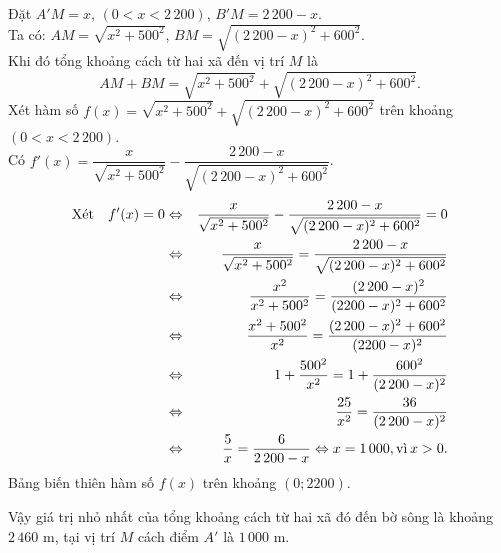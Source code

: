 \begin{bt}
{\begin{center}
        \end{center}
        Đặt $A'M=x$, $(0<x<2\,200)$,  $B'M=2\,200-x$.\\
        Ta có: $AM=\sqrt{x^2+500^2}$, $BM=\sqrt{(2\,200-x)^2+600^2}$.\\
        Khi đó tổng khoảng cách từ hai xã đến vị trí $M$ là
        \[AM+BM= \sqrt{x^2+500^2}+\sqrt{(2\,200-x)^2+600^2}.\]
        Xét hàm số $f(x)= \sqrt{x^2+500^2}+\sqrt{(2\,200-x)^2+600^2}$ trên khoảng $(0<x<2\,200)$.\\ 
        Có $f'(x)=\dfrac{x}{\sqrt{x^2+500^2}}-\dfrac{2\,200-x}{\sqrt{(2\,200-x)^2+600^2}}$.
        \begin{eqnarray*}
            \text{Xét}\quad f'(x)=0&\Leftrightarrow & \dfrac{x}{\sqrt{x^2+500^2}}-\dfrac{2\,200-x}{\sqrt{(2\,200-x)^2+600^2}}=0\\
            &\Leftrightarrow & \dfrac{x}{\sqrt{x^2+500^2}}=\dfrac{2\,200-x}{\sqrt{(2\,200-x)^2+600^2}}\\
            &\Leftrightarrow & \dfrac{x^2}{x^2+500^2}=\dfrac{(2\,200-x)^2}{(2200-x)^2+600^2}\\
            &\Leftrightarrow &\dfrac{x^2+500^2}{x^2}=\dfrac{(2\,200-x)^2+600^2}{(2200-x)^2}\\
            &\Leftrightarrow &  1+\dfrac{500^2}{x^2}=1+\dfrac{600^2}{(2\,200-x)^2}\\
            &\Leftrightarrow &  \dfrac{25}{x^2}=\dfrac{36}{(2\,200-x)^2}\\
            &\Leftrightarrow &\dfrac{5}{x}=\dfrac{6}{2\,200-x} \Leftrightarrow x=1\,000,  \text{vì}\hspace{.2em} x>0.
        \end{eqnarray*}
        Bảng biến thiên hàm số $f(x)$ trên khoảng $\left( 0;2200\right)$.
        \begin{center}
        \end{center}
        Vậy giá trị nhỏ nhất của tổng khoảng cách từ hai xã đó đến bờ sông là khoảng $2\,460 $ m, tại vị trí $M$ cách điểm $A'$  là $1\,000$ m.
    }
\end{bt}

